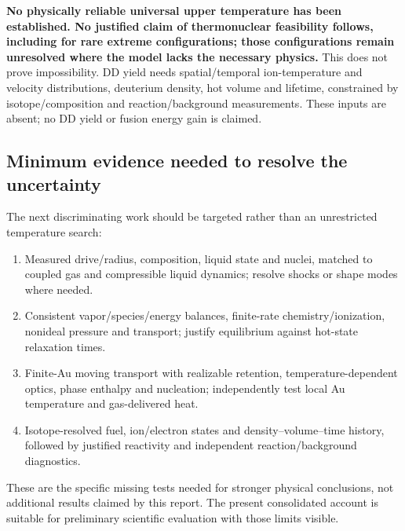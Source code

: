\documentclass[11pt,a4paper]{article}
\begin{document}
\textbf{No physically reliable universal upper temperature has been established. No justified claim of thermonuclear feasibility follows, including for rare extreme configurations; those configurations remain unresolved where the model lacks the necessary physics.} This does not prove impossibility. DD yield needs spatial/temporal ion-temperature and velocity distributions, deuterium density, hot volume and lifetime, constrained by isotope/composition and reaction/background measurements. These inputs are absent; no DD yield or fusion energy gain is claimed.
\subsection{Minimum evidence needed to resolve the uncertainty}
The next discriminating work should be targeted rather than an unrestricted temperature search:
\begin{enumerate}
\item Measured drive/radius, composition, liquid state and nuclei, matched to coupled gas and compressible liquid dynamics; resolve shocks or shape modes where needed.
\item Consistent vapor/species/energy balances, finite-rate chemistry/ionization, nonideal pressure and transport; justify equilibrium against hot-state relaxation times.
\item Finite-Au moving transport with realizable retention, temperature-dependent optics, phase enthalpy and nucleation; independently test local Au temperature and gas-delivered heat.
\item Isotope-resolved fuel, ion/electron states and density--volume--time history, followed by justified reactivity and independent reaction/background diagnostics.
\end{enumerate}
These are the specific missing tests needed for stronger physical conclusions, not additional results claimed by this report. The present consolidated account is suitable for preliminary scientific evaluation with those limits visible.
\clearpage
{}

\clearpage
\end{document}
